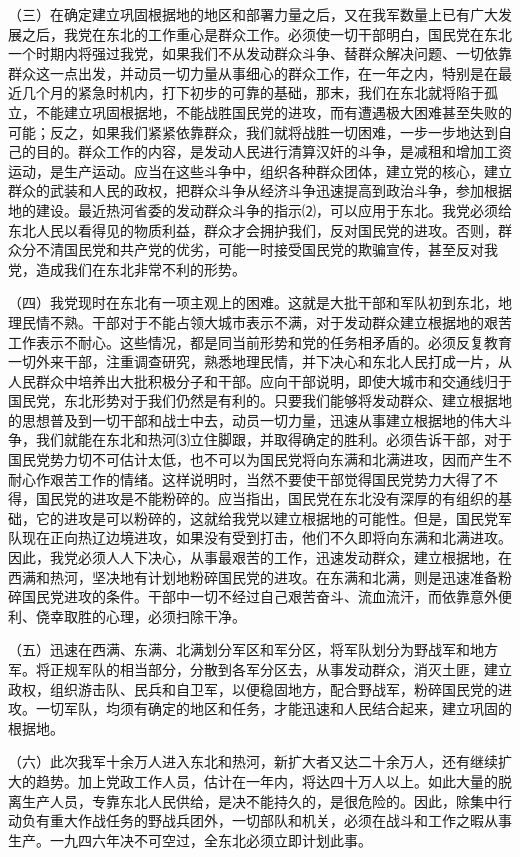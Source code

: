 \documentclass[UTF-8, a5paper, 12pt]{ctexart}
\begin{document}
（三）在确定建立巩固根据地的地区和部署力量之后，又在我军数量上已有广大发展之后，我党在东北的工作重心是群众工作。必须使一切干部明白，国民党在东北一个时期内将强过我党，如果我们不从发动群众斗争、替群众解决问题、一切依靠群众这一点出发，并动员一切力量从事细心的群众工作，在一年之内，特别是在最近几个月的紧急时机内，打下初步的可靠的基础，那末，我们在东北就将陷于孤立，不能建立巩固根据地，不能战胜国民党的进攻，而有遭遇极大困难甚至失败的可能；反之，如果我们紧紧依靠群众，我们就将战胜一切困难，一步一步地达到自己的目的。群众工作的内容，是发动人民进行清算汉奸的斗争，是减租和增加工资运动，是生产运动。应当在这些斗争中，组织各种群众团体，建立党的核心，建立群众的武装和人民的政权，把群众斗争从经济斗争迅速提高到政治斗争，参加根据地的建设。最近热河省委的发动群众斗争的指示⑵，可以应用于东北。我党必须给东北人民以看得见的物质利益，群众才会拥护我们，反对国民党的进攻。否则，群众分不清国民党和共产党的优劣，可能一时接受国民党的欺骗宣传，甚至反对我党，造成我们在东北非常不利的形势。

（四）我党现时在东北有一项主观上的困难。这就是大批干部和军队初到东北，地理民情不熟。干部对于不能占领大城市表示不满，对于发动群众建立根据地的艰苦工作表示不耐心。这些情况，都是同当前形势和党的任务相矛盾的。必须反复教育一切外来干部，注重调查研究，熟悉地理民情，并下决心和东北人民打成一片，从人民群众中培养出大批积极分子和干部。应向干部说明，即使大城市和交通线归于国民党，东北形势对于我们仍然是有利的。只要我们能够将发动群众、建立根据地的思想普及到一切干部和战士中去，动员一切力量，迅速从事建立根据地的伟大斗争，我们就能在东北和热河⑶立住脚跟，并取得确定的胜利。必须告诉干部，对于国民党势力切不可估计太低，也不可以为国民党将向东满和北满进攻，因而产生不耐心作艰苦工作的情绪。这样说明时，当然不要使干部觉得国民党势力大得了不得，国民党的进攻是不能粉碎的。应当指出，国民党在东北没有深厚的有组织的基础，它的进攻是可以粉碎的，这就给我党以建立根据地的可能性。但是，国民党军队现在正向热辽边境进攻，如果没有受到打击，他们不久即将向东满和北满进攻。因此，我党必须人人下决心，从事最艰苦的工作，迅速发动群众，建立根据地，在西满和热河，坚决地有计划地粉碎国民党的进攻。在东满和北满，则是迅速准备粉碎国民党进攻的条件。干部中一切不经过自己艰苦奋斗、流血流汗，而依靠意外便利、侥幸取胜的心理，必须扫除干净。

（五）迅速在西满、东满、北满划分军区和军分区，将军队划分为野战军和地方军。将正规军队的相当部分，分散到各军分区去，从事发动群众，消灭土匪，建立政权，组织游击队、民兵和自卫军，以便稳固地方，配合野战军，粉碎国民党的进攻。一切军队，均须有确定的地区和任务，才能迅速和人民结合起来，建立巩固的根据地。

（六）此次我军十余万人进入东北和热河，新扩大者又达二十余万人，还有继续扩大的趋势。加上党政工作人员，估计在一年内，将达四十万人以上。如此大量的脱离生产人员，专靠东北人民供给，是决不能持久的，是很危险的。因此，除集中行动负有重大作战任务的野战兵团外，一切部队和机关，必须在战斗和工作之暇从事生产。一九四六年决不可空过，全东北必须立即计划此事。
\end{document}
